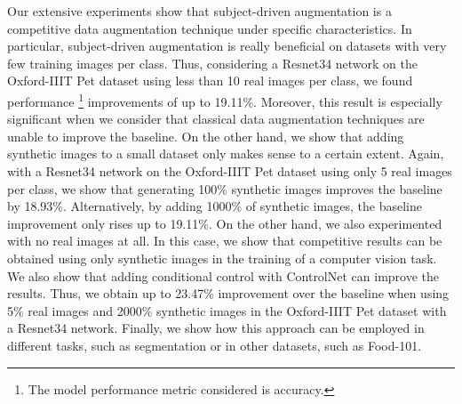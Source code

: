 Our extensive experiments show that subject-driven augmentation is a competitive data augmentation technique under specific characteristics. In particular, subject-driven augmentation is really beneficial on datasets with very few training images per class. Thus, considering a Resnet34 network on the Oxford-IIIT Pet dataset using less than 10 real images per class, we found performance \footnote{The model performance metric considered is accuracy.} improvements of up to 19.11\%. Moreover, this result is especially significant when we consider that classical data augmentation techniques are unable to improve the baseline. On the other hand, we show that adding synthetic images to a small dataset only makes sense to a certain extent. Again, with a Resnet34 network on the Oxford-IIIT Pet dataset using only 5 real images per class, we show that generating 100\% synthetic images improves the baseline by 18.93\%. Alternatively, by adding 1000\% of synthetic images, the baseline improvement only rises up to 19.11\%. On the other hand, we also experimented with no real images at all. In this case, we show that competitive results can be obtained using only synthetic images in the training of a computer vision task. We also show that adding conditional control with ControlNet can improve the results. Thus, we obtain up to 23.47\% improvement over the baseline when using 5\% real images and 2000\% synthetic images in the Oxford-IIIT Pet dataset with a Resnet34 network. Finally, we show how this approach can be employed in different tasks, such as segmentation or in other datasets, such as Food-101.